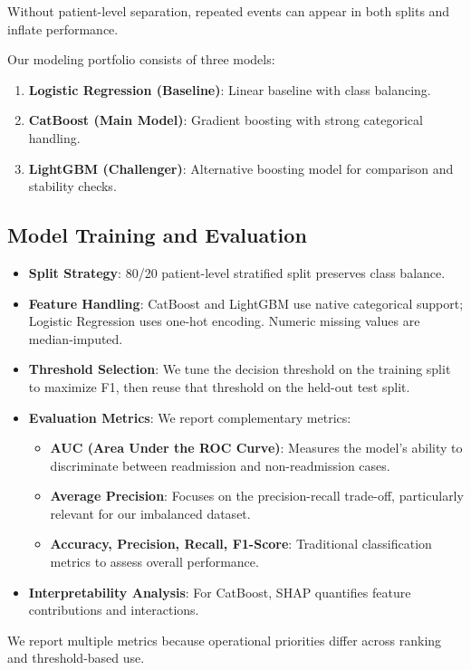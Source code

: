 \documentclass[conference]{IEEEtran}
\begin{document}
Without patient-level separation, repeated events can appear in both splits and inflate performance.

Our modeling portfolio consists of three models:
\begin{enumerate}
    \item \textbf{Logistic Regression (Baseline)}: Linear baseline with class balancing.
    \item \textbf{CatBoost (Main Model)}: Gradient boosting with strong categorical handling.
    \item \textbf{LightGBM (Challenger)}: Alternative boosting model for comparison and stability checks.
\end{enumerate}

\subsection{Model Training and Evaluation}
\begin{itemize}
    \item \textbf{Split Strategy}: 80/20 patient-level stratified split preserves class balance.
    \item \textbf{Feature Handling}: CatBoost and LightGBM use native categorical support; Logistic Regression uses one-hot encoding. Numeric missing values are median-imputed.
    \item \textbf{Threshold Selection}: We tune the decision threshold on the training split to maximize F1, then reuse that threshold on the held-out test split.
    \item \textbf{Evaluation Metrics}: We report complementary metrics:
    \begin{itemize}
        \item \textbf{AUC (Area Under the ROC Curve)}: Measures the model's ability to discriminate between readmission and non-readmission cases.
        \item \textbf{Average Precision}: Focuses on the precision-recall trade-off, particularly relevant for our imbalanced dataset.
        \item \textbf{Accuracy, Precision, Recall, F1-Score}: Traditional classification metrics to assess overall performance.
    \end{itemize}
    \item \textbf{Interpretability Analysis}: For CatBoost, SHAP quantifies feature contributions and interactions.
\end{itemize}

We report multiple metrics because operational priorities differ across ranking and threshold-based use.
\end{document}
